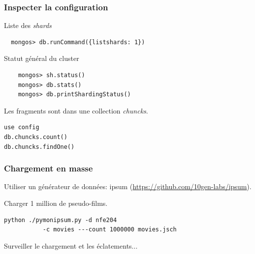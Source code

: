 \begin{frame}[fragile]
\frametitle{Inspecter la configuration}

Liste des \textit{shards}
\begin{verbatim}
  mongos> db.runCommand({listshards: 1})
\end{verbatim}

Statut général du cluster
\begin{verbatim}
    mongos> sh.status()    
    mongos> db.stats()
    mongos> db.printShardingStatus()
\end{verbatim}

Les fragments sont dans une collection \textit{chuncks}.

\begin{verbatim}
use config
db.chuncks.count()
db.chuncks.findOne()
\end{verbatim}
\end{frame}



\begin{frame}[fragile]
\frametitle{Chargement en masse}

Utiliser un générateur de données:
ipsum (\url{https://github.com/10gen-labs/ipsum}).

\vfill

Charger 1 million de pseudo-films.

\begin{verbatim}
python ./pymonipsum.py -d nfe204 
           -c movies ---count 1000000 movies.jsch
\end{verbatim}

\vfill

Surveiller le chargement et les éclatements...

\end{frame}
